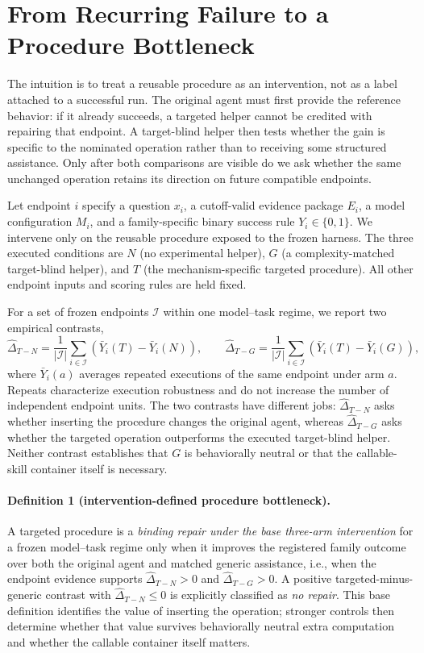\section{From Recurring Failure to a Procedure Bottleneck}
\label{sec:mechanism}
The intuition is to treat a reusable procedure as an intervention, not as a label attached to a successful run. The original agent must first provide the reference behavior: if it already succeeds, a targeted helper cannot be credited with repairing that endpoint. A target-blind helper then tests whether the gain is specific to the nominated operation rather than to receiving some structured assistance. Only after both comparisons are visible do we ask whether the same unchanged operation retains its direction on future compatible endpoints.

Let endpoint $i$ specify a question $x_i$, a cutoff-valid evidence package $E_i$, a model configuration $M_i$, and a family-specific binary success rule $Y_i\in\{0,1\}$. We intervene only on the reusable procedure exposed to the frozen harness. The three executed conditions are $N$ (no experimental helper), $G$ (a complexity-matched target-blind helper), and $T$ (the mechanism-specific targeted procedure). All other endpoint inputs and scoring rules are held fixed.

For a set of frozen endpoints $\mathcal I$ within one model--task regime, we report two empirical contrasts,
\begin{equation}
\widehat{\Delta}_{T-N}
= \frac{1}{|\mathcal I|}\sum_{i\in\mathcal I}\left(\bar Y_i(T)-\bar Y_i(N)\right),
\qquad
\widehat{\Delta}_{T-G}
= \frac{1}{|\mathcal I|}\sum_{i\in\mathcal I}\left(\bar Y_i(T)-\bar Y_i(G)\right),
\end{equation}
where $\bar Y_i(a)$ averages repeated executions of the same endpoint under arm $a$. Repeats characterize execution robustness and do not increase the number of independent endpoint units. The two contrasts have different jobs: $\widehat{\Delta}_{T-N}$ asks whether inserting the procedure changes the original agent, whereas $\widehat{\Delta}_{T-G}$ asks whether the targeted operation outperforms the executed target-blind helper. Neither contrast establishes that $G$ is behaviorally neutral or that the callable-skill container itself is necessary.

\paragraph{Definition 1 (intervention-defined procedure bottleneck).}
A targeted procedure is a \emph{binding repair under the base three-arm intervention} for a frozen model--task regime only when it improves the registered family outcome over both the original agent and matched generic assistance, i.e., when the endpoint evidence supports $\widehat{\Delta}_{T-N}>0$ and $\widehat{\Delta}_{T-G}>0$. A positive targeted-minus-generic contrast with $\widehat{\Delta}_{T-N}\leq0$ is explicitly classified as \emph{no repair}. This base definition identifies the value of inserting the operation; stronger controls then determine whether that value survives behaviorally neutral extra computation and whether the callable container itself matters.

